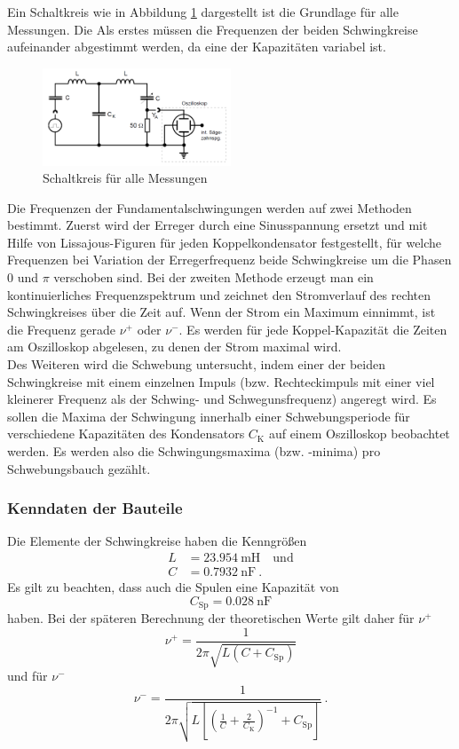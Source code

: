Ein Schaltkreis wie in Abbildung \ref{fig:Abb6} dargestellt ist die Grundlage für alle Messungen. Die Als erstes müssen die Frequenzen der beiden Schwingkreise aufeinander abgestimmt werden, da eine der Kapazitäten variabel ist. \\
\begin{figure}[h!]
	\centering
	\includegraphics[width=0.5\textwidth]{Abb6.png}
	\caption{Schaltkreis für alle Messungen}
	\label{fig:Abb6}
\end{figure}
Die Frequenzen der Fundamentalschwingungen werden auf zwei Methoden bestimmt. Zuerst wird der Erreger durch eine Sinusspannung ersetzt und mit Hilfe von Lissajous-Figuren für jeden Koppelkondensator festgestellt, für welche Frequenzen bei Variation der Erregerfrequenz beide Schwingkreise um die Phasen 0 und $\pi$ verschoben sind. Bei der zweiten Methode erzeugt man ein kontinuierliches Frequenzspektrum und zeichnet den Stromverlauf des rechten Schwingkreises über die Zeit auf. Wenn der Strom ein Maximum einnimmt, ist die Frequenz gerade $\nu^+$ oder $\nu^-$. Es werden für jede Koppel-Kapazität die Zeiten am Oszilloskop abgelesen, zu denen der Strom maximal wird. \\
Des Weiteren wird die Schwebung untersucht, indem einer der beiden Schwingkreise mit einem einzelnen Impuls (bzw. Rechteckimpuls mit einer viel kleinerer Frequenz als der Schwing- und Schwegunsfrequenz) angeregt wird. Es sollen die Maxima der Schwingung innerhalb einer Schwebungsperiode für verschiedene Kapazitäten des Kondensators $C_\text{K}$ auf einem Oszilloskop beobachtet werden. Es werden also die Schwingungsmaxima (bzw. -minima) pro Schwebungsbauch gezählt.
\subsubsection*{Kenndaten der Bauteile \label{sec:Bauteile}}
Die Elemente der Schwingkreise haben die Kenngrößen
\begin{align*}
	L &= \SI{23.954}{\milli\henry} \quad\text{und} \\
	C &= \SI{0.7932}{\nano\farad} \ .
\end{align*}
Es gilt zu beachten, dass auch die Spulen eine Kapazität von
\[ C_\text{Sp} = \SI{0.028}{\nano\farad} \]
haben. Bei der späteren Berechnung der theoretischen Werte gilt daher für $\nu^+$
\[ \nu^+ = \frac{1}{2 \pi \sqrt{L(C+C_\text{Sp})}} \]
und für $\nu^-$
\[ \nu^- = \frac{1}{2 \pi \sqrt{L\left[
		\left(\frac{1}{C} + \frac{2}{C_\text{K}}\right)^{-1}+C_\text{Sp}\right]}} \ . \]